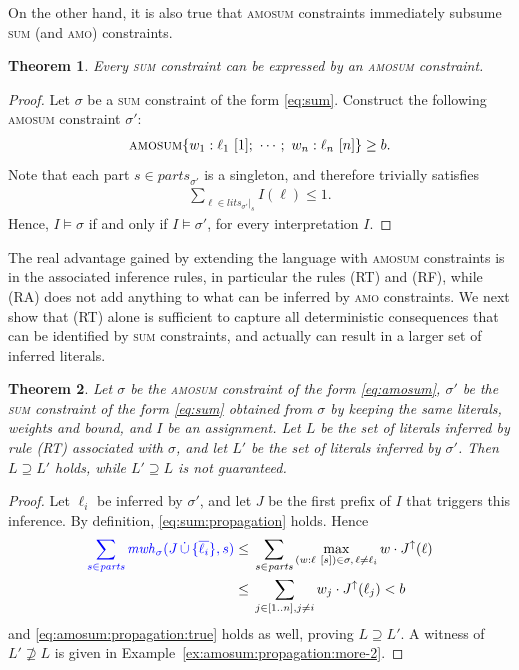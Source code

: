 \documentclass[preprint,authoryear]{elsarticle}
\newcommand{\parts}{\mathit{parts}}
\newcommand{\cupdot}{\,\dot{\cup}\,}
\newtheorem{theorem}{Theorem}[section]
\theoremstyle{definition}
\def\amosum{\ensuremath{\textsc{amosum}}\xspace}
\begin{document}
On the other hand, it is also true that \textsc{amosum} constraints immediately subsume \textsc{sum} (and \textsc{amo}) constraints.

\begin{theorem}
Every \textsc{sum} constraint can be expressed by an \textsc{amosum} constraint.
\end{theorem}
\begin{proof}
Let $\sigma$ be a \textsc{sum} constraint of the form \eqref{eq:sum}.
Construct the following \textsc{amosum} constraint $\sigma'$:
\begin{align*}
    \amosum\{w_1 : \ell_1\ [1];\ \cdots;\ w_n : \ell_n\ [n]\} \geq b.
\end{align*}
Note that each part $s \in \mathit{parts}_{\sigma'}$ is a singleton, and therefore trivially satisfies \begin{align*}
\sum_{\ell \in \mathit{lits}_{\sigma'}|_s}{I(\ell)} \leq 1.
\end{align*}
Hence, $I \models \sigma$ if and only if $I \models \sigma'$, for every interpretation $I$.
\end{proof}

The real advantage gained by extending the language with \textsc{amosum} constraints is in the associated inference rules, in particular the rules (RT) and (RF), while (RA) does not add anything to what can be inferred by \textsc{amo} constraints.
We next show that (RT) alone is sufficient to capture all deterministic consequences that can be identified by \textsc{sum} constraints, and actually can result in a larger set of inferred literals.

\begin{theorem}\label{thm:inferences}
Let $\sigma$ be the \textsc{amosum} constraint of the form \eqref{eq:amosum}, 
$\sigma'$ be the \textsc{sum} constraint of the form \eqref{eq:sum} obtained from $\sigma$ by keeping the same literals, weights and bound, and  $I$ be an assignment.
Let $L$ be the set of literals inferred by rule (RT) associated with $\sigma$, and let $L'$ be the set of literals inferred by $\sigma'$.
Then $L \supseteq L'$ holds, while $L' \supseteq L$ is not guaranteed.
\end{theorem}
\begin{proof}
Let $\ell_i$ be inferred by $\sigma'$, and let $J$ be the first prefix of $I$ that triggers this inference. 
By definition, \eqref{eq:sum:propagation} holds.
Hence
\begin{align*}
   \textcolor{blue}{\sum_{s \in \parts}{\mathit{mwh}_\sigma(J \cupdot \{\overline{\ell_i}\},s)}} \le {} &
    \sum_{s \in \parts}{\max_{(w : \ell\ [s]) \in \sigma,\, \ell \not= \ell_i} w \cdot J^\uparrow(\ell)} \\    
    {}\leq{} & \sum_{j \in [1..n], j \neq i}{w_j \cdot J^\uparrow(\ell_j)} < b
\end{align*}
and \eqref{eq:amosum:propagation:true} holds as well, proving $L \supseteq L'$.
A  witness of $L' \not\supseteq L$ is given in Example~\ref{ex:amosum:propagation:more-2}.
\end{proof}
\end{document}
